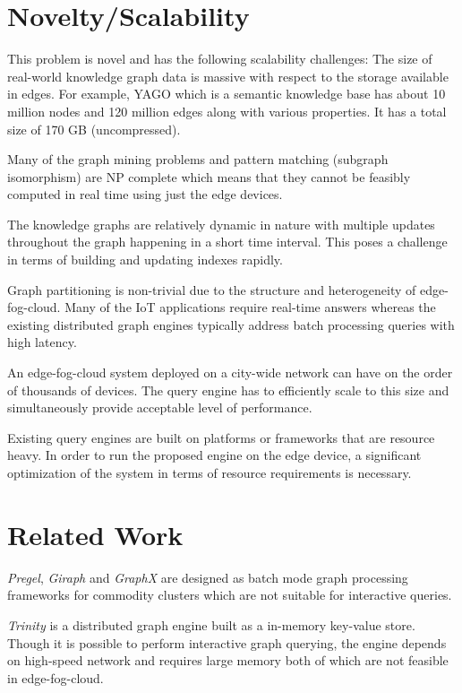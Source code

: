 \documentclass[conference]{IEEEtran}
\begin{document}
\section{Novelty/Scalability}
This problem is novel and has the following scalability challenges: The size of real-world knowledge graph data is massive with respect to the storage available in edges. For example, YAGO\cite{Suchanek:2007:YCS:1242572.1242667} which is a semantic knowledge base has about 10 million nodes and 120 million edges along with various properties. It has a total size of 170 GB (uncompressed).

Many of the graph mining problems and pattern matching (subgraph isomorphism) are NP complete which means that they cannot be feasibly computed in real time using just the edge devices. 

The knowledge graphs are relatively dynamic in nature with multiple updates throughout the graph happening in a short time interval. This poses a challenge in terms of building and updating indexes rapidly.

Graph partitioning is non-trivial due to the structure and heterogeneity of edge-fog-cloud. Many of the IoT applications require real-time answers whereas the existing distributed graph engines typically address batch processing queries with high latency.

An edge-fog-cloud system deployed on a city-wide network can have on the order of thousands of devices.  The query engine has to efficiently scale to this size and simultaneously provide acceptable level of performance.

Existing query engines are built on platforms or frameworks that are resource heavy. In order to run the proposed engine on the edge device, a significant optimization of the system in terms of resource requirements is necessary. 

\section{Related Work}

\emph{Pregel}\cite{Malewicz:2010:PSL:1807167.1807184}, \emph{Giraph}\cite{Ching:2015:OTE:2824032.2824077} and \emph{GraphX}\cite{Xin:2013:GRD:2484425.2484427} are designed as batch mode graph processing frameworks for commodity clusters which are not suitable for interactive queries.

\emph{Trinity}\cite{Shao:2013:TDG:2463676.2467799} is a distributed graph engine built as a in-memory key-value store. Though it is possible to perform interactive graph querying, the engine depends on high-speed network and requires large memory both of which are not feasible in edge-fog-cloud.
\end{document}
